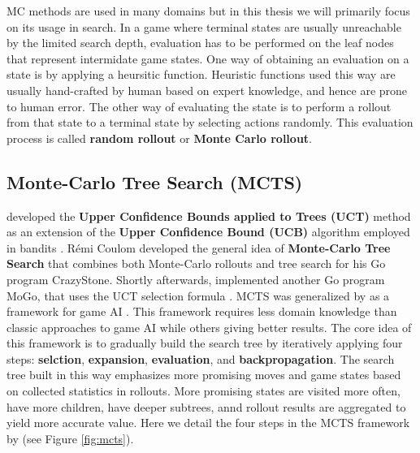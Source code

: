 MC methods are used in many domains but in this thesis we will primarily focus on its usage in search.
In a game where terminal states are usually unreachable by the limited search depth, evaluation has to be performed on the leaf nodes that represent intermidate game states.
One way of obtaining an evaluation on a state is by applying a heursitic function.
Heuristic functions used this way are usually hand-crafted by human based on expert knowledge, and hence are prone to human error.
The other way of evaluating the state is to perform a rollout from that state to a terminal state by selecting actions randomly.
This evaluation process is called \textbf{random rollout} or \textbf{Monte Carlo rollout}.

\subsection{Monte-Carlo Tree Search (MCTS)} \label{sec:mcts}

\citeauthor{BanditBasedMonteCarlo_Kocsis.Szepesvari_2006} developed the \textbf{Upper Confidence Bounds applied to Trees (UCT)} method as an extension of the \textbf{Upper Confidence Bound (UCB)} algorithm employed in bandits \cite{BanditBasedMonteCarlo_Kocsis.Szepesvari_2006}.
Rémi Coulom developed the general idea of \textbf{Monte-Carlo Tree Search} that combines both Monte-Carlo rollouts and tree search \cite{EfficientSelectivityBackup_Coulom_2007} for his Go program CrazyStone.
Shortly afterwards,
\citeauthor{ModificationUCTPatterns_Gelly.Wang.ea_2006} implemented another Go program MoGo, that uses the UCT selection formula \cite{ModificationUCTPatterns_Gelly.Wang.ea_2006}.
MCTS was generalized by \citeauthor{MonteCarloTreeSearch_Chaslot.Bakkes.ea_2008} as a framework for game AI \cite{MonteCarloTreeSearch_Chaslot.Bakkes.ea_2008}.
This framework requires less domain knowledge than classic approaches to game AI while others giving better results.
The core idea of this framework is to gradually build the search tree by iteratively applying four steps: \textbf{selction}, \textbf{expansion}, \textbf{evaluation}, and \textbf{backpropagation}.
The search tree built in this way emphasizes more promising moves and game states based on collected statistics in rollouts.
More promising states are visited more often, have more children, have deeper subtrees, annd rollout results are aggregated to yield more accurate value. Here we detail the four steps in the MCTS framework by \citeauthor{MonteCarloTreeSearch_Chaslot.Bakkes.ea_2008} (see Figure \ref{fig:mcts}).

